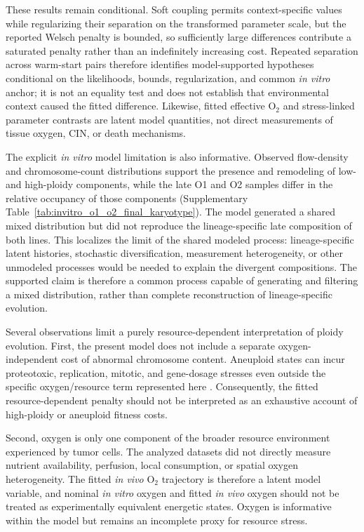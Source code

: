 \documentclass[11pt]{article}
\begin{document}
These results remain conditional. Soft coupling permits context-specific values while regularizing their separation on the transformed parameter scale, but the reported Welsch penalty is bounded, so sufficiently large differences contribute a saturated penalty rather than an indefinitely increasing cost. Repeated separation across warm-start pairs therefore identifies model-supported hypotheses conditional on the likelihoods, bounds, regularization, and common \textit{in vitro} anchor; it is not an equality test and does not establish that environmental context caused the fitted difference. Likewise, fitted effective O$_2$ and stress-linked parameter contrasts are latent model quantities, not direct measurements of tissue oxygen, CIN, or death mechanisms.

The explicit \textit{in vitro} model limitation is also informative. Observed flow-density and chromosome-count distributions support the presence and remodeling of low- and high-ploidy components, while the late O1 and O2 samples differ in the relative occupancy of those components (Supplementary Table~\ref{tab:invitro_o1_o2_final_karyotype}). The model generated a shared mixed distribution but did not reproduce the lineage-specific late composition of both lines. This localizes the limit of the shared modeled process: lineage-specific latent histories, stochastic diversification, measurement heterogeneity, or other unmodeled processes would be needed to explain the divergent compositions. The supported claim is therefore a common process capable of generating and filtering a mixed distribution, rather than complete reconstruction of lineage-specific evolution.

Several observations limit a purely resource-dependent interpretation of ploidy evolution. First, the present model does not include a separate oxygen-independent cost of abnormal chromosome content. Aneuploid states can incur proteotoxic, replication, mitotic, and gene-dosage stresses even outside the specific oxygen/resource term represented here \cite{santaguida_chromosome_2017,sheltzer_single-chromosome_2017,kuznetsova_chromosomal_2015}. Consequently, the fitted resource-dependent penalty should not be interpreted as an exhaustive account of high-ploidy or aneuploid fitness costs.

Second, oxygen is only one component of the broader resource environment experienced by tumor cells. The analyzed datasets did not directly measure nutrient availability, perfusion, local consumption, or spatial oxygen heterogeneity. The fitted \textit{in vivo} O$_2$ trajectory is therefore a latent model variable, and nominal \textit{in vitro} oxygen and fitted \textit{in vivo} oxygen should not be treated as experimentally equivalent energetic states. Oxygen is informative within the model but remains an incomplete proxy for resource stress.
\end{document}
